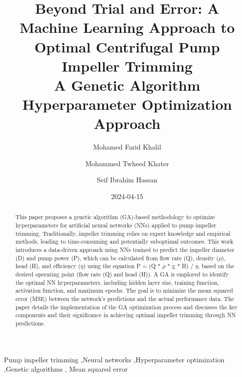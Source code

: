 \documentclass[
  super,
  review,
  3p]{elsarticle}
\date{2024-04-15}
\begin{document}
\begin{frontmatter}
\title{Beyond Trial and Error: A Machine Learning Approach to Optimal
Centrifugal Pump Impeller Trimming \\\large{A Genetic Algorithm
Hyperparameter Optimization Approach} }
\author[1]{Mohamed Farid Khalil%
%
}
\author[1]{Mohammed Twheed Khater%
%
}
\author[1]{Seif Ibrahim Hassan%
%
}



        
\begin{abstract}
This paper proposes a genetic algorithm (GA)-based methodology to
optimize hyperparameters for artificial neural networks (NNs) applied to
pump impeller trimming. Traditionally, impeller trimming relies on
expert knowledge and empirical methods, leading to time-consuming and
potentially suboptimal outcomes. This work introduces a data-driven
approach using NNs trained to predict the impeller diameter (D) and pump
power (P), which can be calculated from flow rate (Q), density
(\(\rho\)), head (H), and efficiency (\(\eta\)) using the equation P =
(Q * \(\rho\) * g * H) / \(\eta\). based on the desired operating point
(flow rate (Q) and head (H)). A GA is employed to identify the optimal
NN hyperparameters, including hidden layer size, training function,
activation function, and maximum epochs. The goal is to minimize the
mean squared error (MSE) between the network's predictions and the
actual performance data. The paper details the implementation of the GA
optimization process and discusses the key components and their
significance in achieving optimal impeller trimming through NN
predictions.
\end{abstract}





\begin{keyword}
    Pump impeller trimming \sep Neural networks \sep Hyperparameter
optimization \sep Genetic algorithms \sep 
    Mean squared error
\end{keyword}
\end{frontmatter}
    
\end{document}
